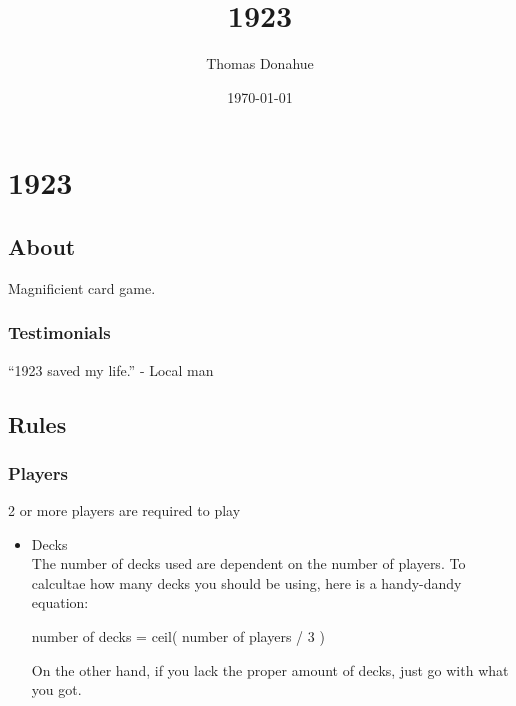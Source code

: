 \documentclass[11pt]{article}
\title{1923}
\author{Thomas Donahue}
\date{\today}
\begin{document}
\maketitle

\setcounter{tocdepth}{3}
\tableofcontents
\vspace*{1cm}
\section{1923}
\label{sec-1}
\subsection{About}
\label{sec-1-1}

Magnificient card game.
\subsubsection{Testimonials}
\label{sec-1-1-1}

``1923 saved my life.'' - Local man
\subsection{Rules}
\label{sec-1-2}
\subsubsection{Players}
\label{sec-1-2-1}

2 or more players are required to play
\begin{itemize}

\item Decks\\
\label{sec-1-2-1-1}%
The number of decks used are dependent on the number of players. To
calcultae how many decks you should be using, here is a handy-dandy
equation:

number of decks = ceil( number of players / 3 )

On the other hand, if you lack the proper amount of decks, just go
with what you got. 

\end{itemize} %
\end{document}
